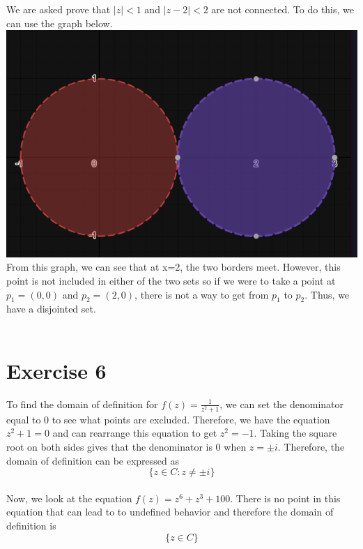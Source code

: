 \documentclass[notitlepage]{article}
\begin{document}
    \hspace{1cm} We are asked prove that $|z| < 1$ and $|z-2| < 2$ are not connected. To do this,
    we can use the graph below. \\
\includegraphics[scale=0.5]{hw1_5}\\
    From this graph, we can see that at x=2, the two borders meet. However, this point is not included
    in either of the two sets so if we were to take a point at $p_1=(0,0)$ and $p_2=(2,0)$, there is not a way 
    to get from $p_1$ to $p_2$. Thus, we have a disjointed set. \\~\\
    
\section*{Exercise 6}

    \hspace{1cm} To find the domain of definition for $f(z) = \frac{1}{z^2+1}$, we can set the denominator
    equal to 0 to see what points are excluded. Therefore, we have the equation $z^2+1=0$ and can rearrange
    this equation to get $z^2=-1$. Taking the square root on both sides gives that the denominator
    is 0 when $z=\pm i$. Therefore, the domain of definition can be expressed as 
    $$\{z \in C : z \neq \pm i \}$$ \\

    Now, we look at the equation $f(z) = z^6+z^3+100$. There is no point in this equation that can lead to
    to undefined behavior and therefore the domain of definition is
    $$\{ z \in C \}$$ \\~\\
\end{document}
